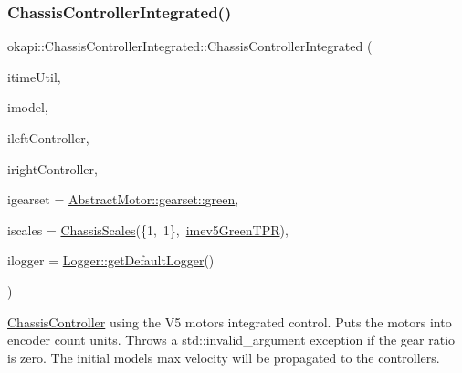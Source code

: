 \subsubsection{\texorpdfstring{ChassisControllerIntegrated()}{ChassisControllerIntegrated()}}
{\footnotesize\ttfamily okapi\+::\+Chassis\+Controller\+Integrated\+::\+Chassis\+Controller\+Integrated (\begin{DoxyParamCaption}\item[{const \mbox{\hyperlink{classokapi_1_1TimeUtil}{Time\+Util}} \&}]{itime\+Util,  }\item[{std\+::shared\+\_\+ptr$<$ \mbox{\hyperlink{classokapi_1_1ChassisModel}{Chassis\+Model}} $>$}]{imodel,  }\item[{std\+::unique\+\_\+ptr$<$ \mbox{\hyperlink{classokapi_1_1AsyncPosIntegratedController}{Async\+Pos\+Integrated\+Controller}} $>$}]{ileft\+Controller,  }\item[{std\+::unique\+\_\+ptr$<$ \mbox{\hyperlink{classokapi_1_1AsyncPosIntegratedController}{Async\+Pos\+Integrated\+Controller}} $>$}]{iright\+Controller,  }\item[{const \mbox{\hyperlink{structokapi_1_1AbstractMotor_1_1GearsetRatioPair}{Abstract\+Motor\+::\+Gearset\+Ratio\+Pair}} \&}]{igearset = {\ttfamily \mbox{\hyperlink{classokapi_1_1AbstractMotor_a88aaa6ea2fa10f5520a537bbf26774d5a9f27410725ab8cc8854a2769c7a516b8}{Abstract\+Motor\+::gearset\+::green}}},  }\item[{const \mbox{\hyperlink{classokapi_1_1ChassisScales}{Chassis\+Scales}} \&}]{iscales = {\ttfamily \mbox{\hyperlink{classokapi_1_1ChassisScales}{Chassis\+Scales}}(\{1,~1\},~\mbox{\hyperlink{namespaceokapi_a5263bab3bfecd482a573b6d04fb584ac}{imev5\+Green\+T\+PR}})},  }\item[{std\+::shared\+\_\+ptr$<$ \mbox{\hyperlink{classokapi_1_1Logger}{Logger}} $>$}]{ilogger = {\ttfamily \mbox{\hyperlink{classokapi_1_1Logger_a5053cf778b4b55acba788a3797dc96d2}{Logger\+::get\+Default\+Logger}}()} }\end{DoxyParamCaption})}

\mbox{\hyperlink{classokapi_1_1ChassisController}{Chassis\+Controller}} using the V5 motor\textquotesingle{}s integrated control. Puts the motors into encoder count units. Throws a std\+::invalid\+\_\+argument exception if the gear ratio is zero. The initial model\textquotesingle{}s max velocity will be propagated to the controllers.


